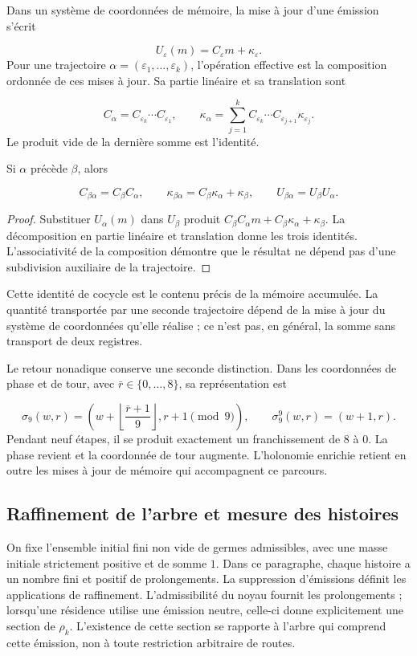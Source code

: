 Dans un système de coordonnées de mémoire, la mise à jour d’une émission s’écrit

\[
U_\varepsilon(m)=C_\varepsilon m+\kappa_\varepsilon.
\]
Pour une trajectoire \(\alpha=(\varepsilon_1,\ldots,\varepsilon_k)\), l'opération effective est la composition ordonnée de ces mises à jour. Sa partie linéaire et sa translation sont

\[
C_\alpha=C_{\varepsilon_k}\cdots C_{\varepsilon_1},
\qquad
\kappa_\alpha=
\sum_{j=1}^{k}C_{\varepsilon_k}\cdots
C_{\varepsilon_{j+1}}\kappa_{\varepsilon_j}.
\]
Le produit vide de la dernière somme est l'identité.

\begin{proposition}
\label{iv:cont:concatenacion}
Si \(\alpha\) précède \(\beta\), alors

\[
C_{\beta\alpha}=C_\beta C_\alpha,
\qquad
\kappa_{\beta\alpha}=C_\beta\kappa_\alpha+\kappa_\beta,
\qquad
U_{\beta\alpha}=U_\beta U_\alpha.
\]
\end{proposition}
\begin{proof}
Substituer \(U_\alpha(m)\) dans \(U_\beta\) produit \(C_\beta C_\alpha m+C_\beta\kappa_\alpha+\kappa_\beta\). La décomposition en partie linéaire et translation donne les trois identités. L'associativité de la composition démontre que le résultat ne dépend pas d'une subdivision auxiliaire de la trajectoire.
\end{proof}

Cette identité de cocycle est le contenu précis de la mémoire accumulée. La quantité transportée par une seconde trajectoire dépend de la mise à jour du système de coordonnées qu’elle réalise ; ce n’est pas, en général, la somme sans transport de deux registres.

Le retour nonadique conserve une seconde distinction. Dans les coordonnées de phase et de tour, avec \(\bar r\in\{0,\ldots,8\}\), sa représentation est

\[
\sigma_9(w,r)=
\left(w+\left\lfloor\frac{\bar r+1}{9}\right\rfloor,
r+1\pmod9\right),
\qquad
\sigma_9^9(w,r)=(w+1,r).
\]
Pendant neuf étapes, il se produit exactement un franchissement de \(8\) à \(0\). La phase revient et la coordonnée de tour augmente. L'holonomie enrichie retient en outre les mises à jour de mémoire qui accompagnent ce parcours.

\subsection{Raffinement de l'arbre et mesure des histoires}
\label{iv:cont:medida}
On fixe l’ensemble initial fini non vide de germes admissibles, avec une masse initiale strictement positive et de somme \(1\). Dans ce paragraphe, chaque histoire a un nombre fini et positif de prolongements. La suppression d’émissions définit les applications de raffinement. L’admissibilité du noyau fournit les prolongements ; lorsqu’une résidence utilise une émission neutre, celle-ci donne explicitement une section de \(\rho_k\). L’existence de cette section se rapporte à l’arbre qui comprend cette émission, non à toute restriction arbitraire de routes.

